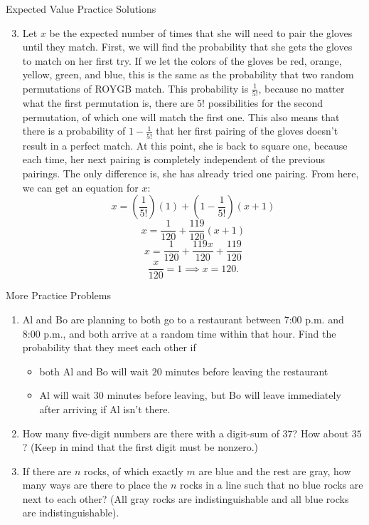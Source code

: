 \documentclass[9pt]{beamer}
\begin{document}
\begin{frame}[t]{Expected Value Practice Solutions}
    \begin{enumerate}
    \setcounter{enumi}{2}
        \item Let $x$ be the expected number of times that she will need to pair the gloves until they match. First, we will find the probability that she gets the gloves to match on her first try. If we let the colors of the gloves be red, orange, yellow, green, and blue, this is the same as the probability that two random permutations of ROYGB match. This probability is $\frac{1}{5!}$, because no matter what the first permutation is, there are $5!$ possibilities for the second permutation, of which one will match the first one. This also means that there is a probability of $1-\frac{1}{5!}$ that her first pairing of the gloves doesn't result in a perfect match. At this point, she is back to square one, because each time, her next pairing is completely independent of the previous pairings. The only difference is, she has already tried one pairing. From here, we can get an equation for $x$:
        $$x=\left(\frac{1}{5!}\right)(1)+\left(1-\frac{1}{5!}\right)(x+1)$$
        $$x=\frac{1}{120}+\frac{119}{120}(x+1)$$
        $$x=\frac{1}{120}+\frac{119x}{120}+\frac{119}{120}$$
        $$\frac{x}{120}=1\implies x=120.$$
    \end{enumerate}
    
\end{frame}









\begin{frame}[t]{More Practice Problems}
    \begin{enumerate}
        \item Al and Bo are planning to both go to a restaurant between 7:00 p.m. and 8:00 p.m., and both arrive at a random time within that hour. Find the probability that they meet each other if
        \begin{itemize}
            \item both Al and Bo will wait $20$ minutes before leaving the restaurant
            \item Al will wait $30$ minutes before leaving, but Bo will leave immediately after arriving if Al isn't there.
        \end{itemize}
        \item How many five-digit numbers are there with a digit-sum of $37$? How about $35$? (Keep in mind that the first digit must be nonzero.)
        \item If there are $n$ rocks, of which exactly $m$ are blue and the rest are gray, how many ways are there to place the $n$ rocks in a line such that no blue rocks are next to each other? (All gray rocks are indistinguishable and all blue rocks are indistinguishable).
        
    \end{enumerate}
    
\end{frame}
\end{document}
